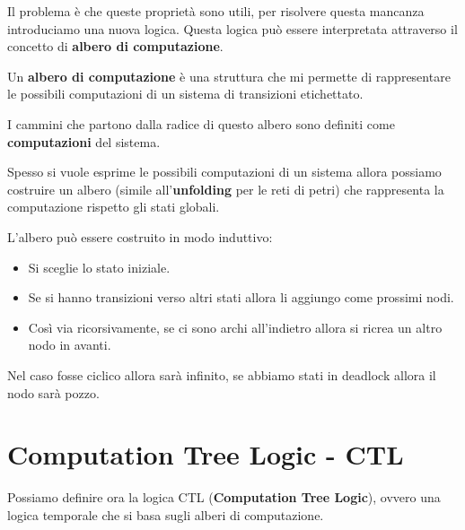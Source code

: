 Il problema è che queste proprietà sono utili, per risolvere questa mancanza
introduciamo una nuova logica. Questa logica può essere interpretata attraverso
il concetto di \textbf{albero di computazione}.
\begin{definizione}
    Un \textbf{albero di computazione} è una struttura che mi permette di
    rappresentare le possibili computazioni di un sistema di transizioni
    etichettato.

    I cammini che partono dalla radice di questo albero sono definiti come
    \textbf{computazioni} del sistema.
\end{definizione}
\begin{nota}
    Spesso si vuole esprime le possibili computazioni di un sistema allora
    possiamo costruire un albero (simile all'\textbf{unfolding} per le reti di
    petri) che rappresenta la computazione rispetto gli stati globali.

    L'albero può essere costruito in modo induttivo:
    \begin{itemize}
        \item Si sceglie lo stato iniziale.
        \item Se si hanno transizioni verso altri stati allora li aggiungo come
              prossimi nodi.
        \item Così via ricorsivamente, se ci sono archi all'indietro allora
              si ricrea un altro nodo in avanti.
    \end{itemize}
    Nel caso fosse ciclico allora sarà infinito, se abbiamo stati in deadlock
    allora il nodo sarà pozzo.
\end{nota}
\section{Computation Tree Logic - CTL}
Possiamo definire ora la logica CTL (\textbf{Computation Tree Logic}), ovvero
una logica temporale che si basa sugli alberi di computazione.

